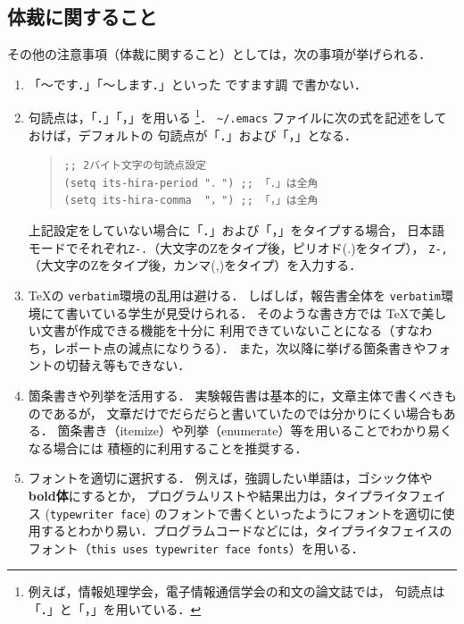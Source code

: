 \documentclass{jarticle}[11pt]
\begin{document}
\subsection{体裁に関すること}

その他の注意事項（体裁に関すること）としては，次の事項が挙げられる．
\begin{enumerate}
\item 「〜です．」「〜します．」といった {\gt ですます調} で書かない．

\item 句読点は，「．」「，」を用いる
\footnote{例えば，情報処理学会，電子情報通信学会の和文の論文誌では，
句読点は「．」と「，」を用いている．}．
\verb|~/.emacs| ファイルに次の式を記述をしておけば，デフォルトの
句読点が「．」および「，」となる．
%
\begin{quote}
\begin{verbatim}
;; 2バイト文字の句読点設定 
(setq its-hira-period "．") ;; 「．」は全角
(setq its-hira-comma  "，") ;; 「，」は全角
\end{verbatim}
\end{quote}
上記設定をしていない場合に「．」および「，」をタイプする場合，
日本語モードでそれぞれ\verb|Z-.|（大文字のZをタイプ後，ピリオド(.)をタイプ），
\verb|Z-,|（大文字のZをタイプ後，カンマ(,)をタイプ）を入力する．

\item \TeX の \verb|verbatim|環境の乱用は避ける．
しばしば，報告書全体を \verb|verbatim|環境にて書いている学生が見受けられる．
そのような書き方では \TeX で美しい文書が作成できる機能を十分に
利用できていないことになる（すなわち，レポート点の減点になりうる）．
また，次以降に挙げる箇条書きやフォントの切替え等もできない．

\item 箇条書きや列挙を活用する．
実験報告書は基本的に，文章主体で書くべきものであるが，
文章だけでだらだらと書いていたのでは分かりにくい場合もある．
箇条書き（itemize）や列挙（enumerate）等を用いることでわかり易くなる場合には
積極的に利用することを推奨する．

\item フォントを適切に選択する．
例えば，強調したい単語は，{\gt ゴシック体}や{\gt \bf bold体}にするとか，
プログラムリストや結果出力は，タイプライタフェイス
(\verb|typewriter face|) のフォントで書くといったようにフォントを適切に使用するとわかり易い．プログラムコードなどには，タイプライタフェイスのフォント（\verb|this uses typewriter face fonts|）を用いる．


\end{enumerate}
\end{document}
